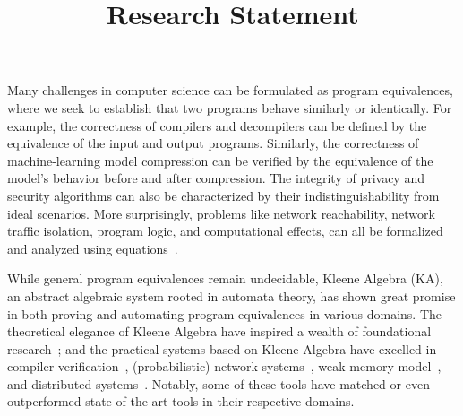 \documentclass[11pt,a4paper,sans]{moderncv} %
\title{Research Statement}
\begin{document}
\makecvtitle %

\setlength\parskip{8px}

Many challenges in computer science can be formulated as program equivalences, where we seek to establish that two programs behave similarly or identically. 
For example, the correctness of compilers and decompilers can be defined by the equivalence of the input and output programs. 
Similarly, the correctness of machine-learning model compression can be verified by the equivalence of the model's behavior before and after compression. 
The integrity of privacy and security algorithms can also be characterized by their indistinguishability from ideal scenarios. 
More surprisingly, problems like network reachability, network traffic isolation, program logic, and computational effects, can all be formalized and analyzed using equations~\cite{anderson_NetKATSemanticFoundations_2014a,zhang_IncorrectnessLogicKleene_2022,moller_AlgebraProgramCorrectness_2021,plotkin_HandlersAlgebraicEffects_2009,plotkin_AdequacyAlgebraicEffects_2001}.

While general program equivalences remain undecidable, Kleene Algebra (KA), an abstract algebraic system rooted in automata theory, has shown great promise in both proving and automating program equivalences in various domains. 
The theoretical elegance of Kleene Algebra have inspired a wealth of foundational research~\cite{smolka_GuardedKleeneAlgebra_2020,schmid_GuardedKleeneAlgebra_2021,jacobs_BialgebraicReviewDeterministic_2006,kozen_CoalgebraicTheoryKleene_2008,schmid_CoalgebraicCompletenessTheorems_2024,rozowski_ProbabilisticGuardedKAT_2023}; and the practical systems based on Kleene Algebra have excelled in compiler verification~\cite{kozen_CertificationCompilerOptimizations_2000d}, (probabilistic) network systems~\cite{anderson_NetKATSemanticFoundations_2014a,foster_CoalgebraicDecisionProcedure_2015,smolka_ScalableVerificationProbabilistic_2019,zhang_NetterProbabilisticStateful_2021}, weak memory model~\cite{kokologiannakis_KaterAutomatingWeak_2023}, and distributed systems~\cite{mciver_UsingProbabilisticKleene_2008}. 
Notably, some of these tools have matched or even outperformed state-of-the-art tools in their respective domains.
\end{document}
